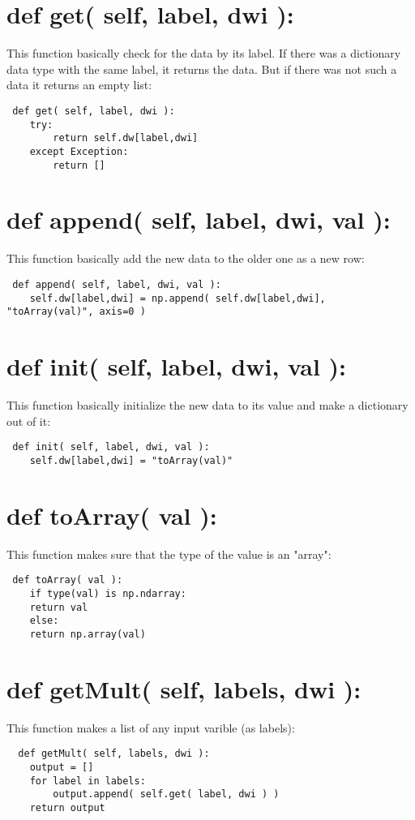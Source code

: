 \section{ def get( self, label, dwi ):}
This function basically check for the data by its label. If there was a dictionary data type with the same label, it returns the data. But if there was not such a data it returns an empty list:
\begin{lstlisting}
 def get( self, label, dwi ):
	try:
	    return self.dw[label,dwi]
	except Exception:
	    return []
\end{lstlisting}
\section{ def append( self, label, dwi, val ):}
This function basically add the new data to the older one as a new row:
\begin{lstlisting}
 def append( self, label, dwi, val ):
	self.dw[label,dwi] = np.append( self.dw[label,dwi], "toArray(val)", axis=0 )
\end{lstlisting}
\section{ def init( self, label, dwi, val ):}
This function basically initialize the new data to its value and make a dictionary out of it:
\begin{lstlisting}
 def init( self, label, dwi, val ):
	self.dw[label,dwi] = "toArray(val)"
\end{lstlisting}
\section{ def toArray( val ):}
This function makes sure that the type of the value is an "array":
\begin{lstlisting}
 def toArray( val ):
    if type(val) is np.ndarray:
	return val
    else:
	return np.array(val)
\end{lstlisting}
\section{ def getMult( self, labels, dwi ):}
This function makes a list of any input varible (as labels):
\begin{lstlisting}
  def getMult( self, labels, dwi ):
	output = []
	for label in labels:
	    output.append( self.get( label, dwi ) )
	return output
\end{lstlisting}
